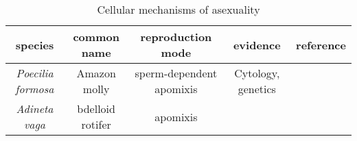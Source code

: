 \documentclass{article}
\begin{document}
\thispagestyle{empty}
\begin{table}
  \caption{Cellular mechanisms of asexuality}
  \centering

    \begin{tabular}{ c c c c c }
      species & common name & reproduction mode & evidence & reference \\
      \hline
      \textit{Poecilia formosa}	&	Amazon molly & sperm-dependent apomixis & Cytology, genetics & \cite{Lamatsch2000} \\
      \textit{Adineta vaga} & bdelloid rotifer & apomixis & & \cite{MarkWelch1998}
    \end{tabular}


  \end{table}

  \clearpage
  \newpage

  {}
  
\end{document}
